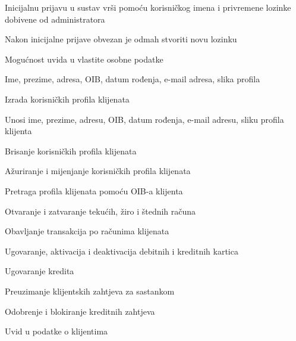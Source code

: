 \begin{packed_enum}
\begin{packed_enum}
					\item Inicijalnu prijavu u sustav vrši pomoću korisničkog imena i privremene lozinke dobivene od administratora
					\begin{packed_enum}
						\item Nakon inicijalne prijave obvezan je odmah stvoriti novu lozinku
					\end{packed_enum}
					\item Mogućnost uvida u vlastite osobne podatke
					\begin{packed_enum}
						\item Ime, prezime, adresa, OIB, datum rođenja, e-mail adresa, slika profila
					\end{packed_enum}
					\item Izrada korisničkih profila klijenata
					\begin{packed_enum}
						\item Unosi ime, prezime, adresu, OIB, datum rođenja, e-mail adresu, sliku profila klijenta
					\end{packed_enum}
					\item Brisanje korisničkih profila klijenata
					\item Ažuriranje i mijenjanje korisničkih profila klijenata
					\item Pretraga profila klijenata pomoću OIB-a klijenta
					\item Otvaranje i zatvaranje tekućih, žiro i štednih računa
					\item Obavljanje transakcija po računima klijenata
					\item Ugovaranje, aktivacija i deaktivacija debitnih i kreditnih kartica
					\item Ugovaranje kredita
					\item Preuzimanje klijentskih zahtjeva za sastankom
					
				\end{packed_enum}
			
				\item	{}
				
				\begin{packed_enum}
					
					\item Odobrenje i blokiranje kreditnih zahtjeva
					\item Uvid u podatke o klijentima
					
				\end{packed_enum}
				

\end{packed_enum}
